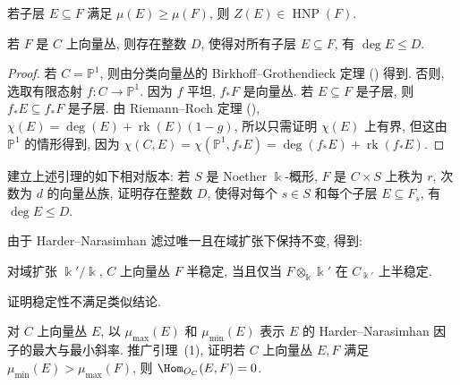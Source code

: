 \begin{corollary}[来自证明]\label{src:9.1.26}
若子层 $E\subseteq F$ 满足 $\mu(E)\geq\mu(F)$, 则 $Z(E)\in\operatorname{HNP}(F)$.
\end{corollary}
\begin{lemma}\label{src:9.1.27}
若 $F$ 是 $C$ 上向量丛, 则存在整数 $D$, 使得对所有子层 $E\subseteq F$, 有 $\deg E\leq D$.
\end{lemma}
\begin{proof}
若 $C=\mathbb P^1$, 则由分类向量丛的 Birkhoff--Grothendieck 定理 () 得到. 否则, 选取有限态射 $f:C\to\mathbb P^1$. 因为 $f$ 平坦, $f_*F$ 是向量丛. 若 $E\subseteq F$ 是子层, 则 $f_*E\subseteq f_*F$ 是子层. 由 Riemann--Roch 定理 (), $\chi(E)=\deg(E)+\operatorname{rk}(E)(1-g)$, 所以只需证明 $\chi(E)$ 上有界, 但这由 $\mathbb P^1$ 的情形得到, 因为 $\chi(C,E)=\chi(\mathbb P^1,f_*E)=\deg(f_*E)+\operatorname{rk}(f_*E)$.
\end{proof}
\begin{exercise}[简单, 后文需要]\label{src:9.1.28}
建立上述引理的如下相对版本: 若 $S$ 是 Noether $\Bbbk$-概形, $F$ 是 $C\times S$ 上秩为 $r$, 次数为 $d$ 的向量丛族, 证明存在整数 $D$, 使得对每个 $s\in S$ 和每个子层 $E\subseteq F_s$, 有 $\deg E\leq D$.
\end{exercise}
由于 Harder--Narasimhan 滤过唯一且在域扩张下保持不变, 得到:
\begin{corollary}\label{src:9.1.29}
对域扩张 $\Bbbk'/\Bbbk$, $C$ 上向量丛 $F$ 半稳定, 当且仅当 $F\otimes_{\Bbbk}\Bbbk'$ 在 $C_{\Bbbk'}$ 上半稳定.
\end{corollary}
\begin{exercise}[中等]\label{src:9.1.30}
证明稳定性不满足类似结论.
\end{exercise}
\begin{exercise}\label{src:9.1.31}
对 $C$ 上向量丛 $E$, 以 $\mu_{\max}(E)$ 和 $\mu_{\min}(E)$ 表示 $E$ 的 Harder--Narasimhan 因子的最大与最小斜率. 推广引理~(1), 证明若 $C$ 上向量丛 $E,F$ 满足 $\mu_{\min}(E)>\mu_{\max}(F)$, 则 $\Hom_{\mathcal O_C}(E,F)=0$.
\end{exercise}
